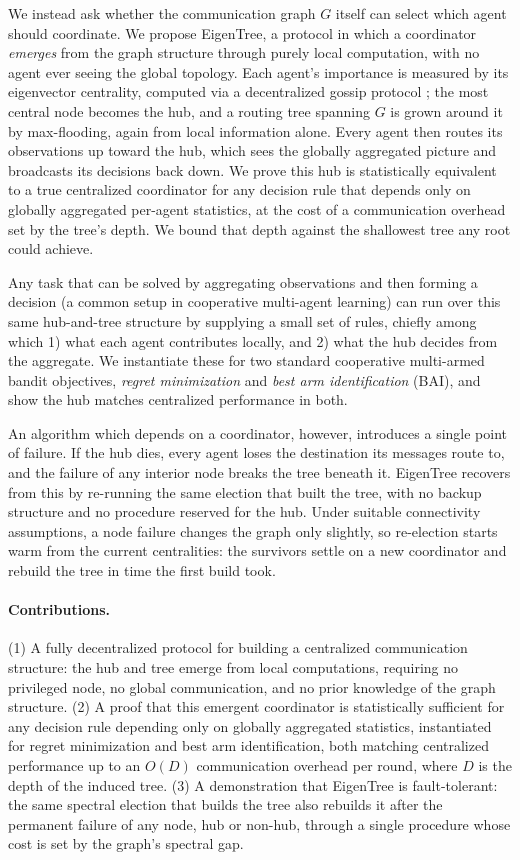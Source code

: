 \documentclass[letterpaper]{article} %
\begin{document}
We instead ask whether the communication graph $G$ itself can select which
agent should coordinate. We propose EigenTree, a protocol in which a coordinator
\emph{emerges} from the graph structure through purely local computation, with
no agent ever seeing the global topology. Each agent's importance is measured by
its eigenvector centrality, computed via a decentralized gossip protocol
\citep{jelasity2007asynchronous}; the most central node becomes the hub, and a
routing tree spanning $G$ is grown around it by max-flooding, again from local
information alone. Every agent then routes its observations up toward the hub,
which sees the globally aggregated picture and broadcasts its decisions back
down. We prove this hub is statistically equivalent to a true centralized
coordinator for any decision rule that depends only on globally aggregated
per-agent statistics, at the cost of a communication overhead set by the tree's
depth. We bound that depth against the shallowest tree any root could achieve.

Any task that can be solved by aggregating observations and then forming a
decision (a common setup in cooperative multi-agent learning) can run over this
same hub-and-tree structure by supplying a small set of rules, chiefly among
which 1) what each agent contributes locally, and 2) what the hub decides from
the aggregate. We instantiate these for two standard cooperative multi-armed
bandit objectives, \emph{regret minimization} and \emph{best arm
identification} (BAI), and show the hub matches centralized performance in
both.

An algorithm which depends on a coordinator, however, introduces a single point
of failure. If the hub dies, every agent loses the destination its messages
route to, and the failure of any interior node breaks the tree beneath it.
EigenTree recovers from this by re-running the same election that built the
tree, with no backup structure and no procedure reserved for the hub. Under
suitable connectivity assumptions, a node failure changes the graph only
slightly, so re-election starts warm from the current centralities: the
survivors settle on a new coordinator and rebuild the tree in time the
first build took.

\paragraph{Contributions.} (1) A fully decentralized protocol for building a
centralized communication structure: the hub and tree emerge from local
computations, requiring no privileged node, no global communication, and no
prior knowledge of the graph structure. (2) A proof that this emergent
coordinator is statistically sufficient for any decision rule depending only on
globally aggregated statistics, instantiated for regret minimization and best
arm identification, both matching centralized performance up to an $O(D)$
communication overhead per round, where $D$ is the depth of the induced tree.
(3) A demonstration that EigenTree is fault-tolerant: the same spectral
election that builds the tree also rebuilds it after the permanent failure of
any node, hub or non-hub, through a single procedure whose cost is set by the
graph's spectral gap.
\end{document}
